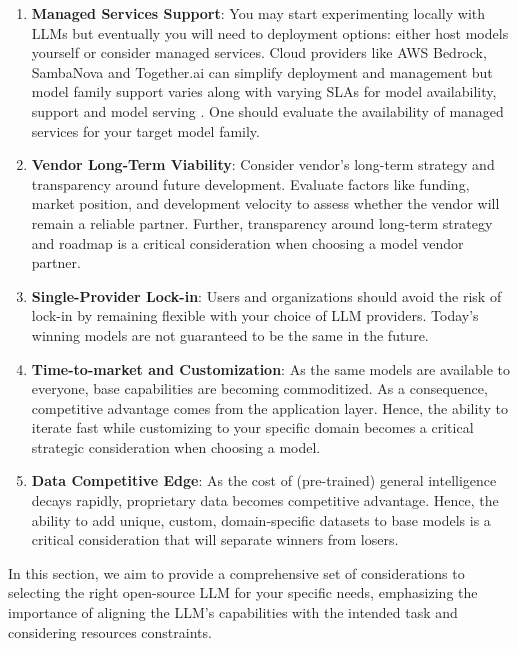 \begin{enumerate}
    \item \textbf{Managed Services Support}: You may start experimenting locally with LLMs but eventually you will need to deployment options: either host models yourself or consider managed services. Cloud providers like AWS Bedrock, SambaNova and Together.ai can simplify deployment and management but model family support varies along with varying SLAs for model availability, support and model serving . One should evaluate the availability of managed services for your target model family. 

    \item \textbf{Vendor Long-Term Viability}: Consider vendor's long-term strategy and transparency around future development. Evaluate factors like funding, market position, and development velocity to assess whether the vendor will remain a reliable partner. Further, transparency around long-term strategy and roadmap is a critical consideration when choosing a model vendor partner.

    \item \textbf{Single-Provider Lock-in}: Users and organizations should avoid the risk of lock-in by remaining flexible with your choice of LLM providers. Today's winning models are not guaranteed to be the same in the future.

    \item \textbf{Time-to-market and Customization}: As the same models are available to everyone, base capabilities are becoming commoditized. As a consequence, competitive advantage comes from the application layer. Hence, the ability to iterate fast while customizing to your specific domain becomes a critical strategic consideration when choosing a model.

    \item \textbf{Data Competitive Edge}: As the cost of (pre-trained) general intelligence decays rapidly, proprietary data becomes competitive advantage. Hence, the ability to add unique, custom, domain-specific datasets to base models is a critical consideration that will separate winners from losers.
\end{enumerate}

In this section, we aim to provide a comprehensive set of considerations to selecting the right open-source LLM for your specific needs, emphasizing the importance of aligning the LLM's capabilities with the intended task and considering resources constraints.


